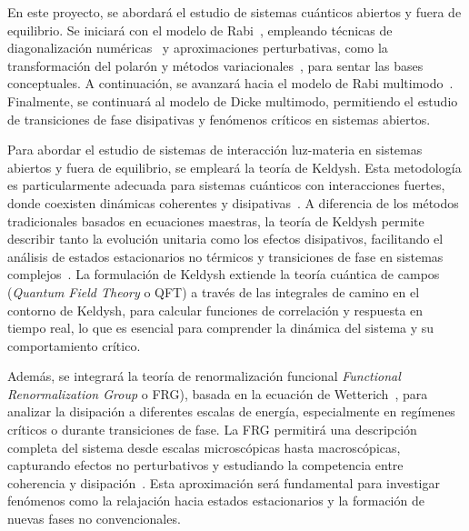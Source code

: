 \documentclass[onecolumn,notitlepage,letterpaper,aps,pra,12pt]{article}
\numberwithin{equation}{section}
\begin{document}













En este proyecto, se abordará el estudio de sistemas cuánticos abiertos y fuera de equilibrio. Se iniciará con el modelo de Rabi~\cite{rabi1936}, empleando técnicas  de diagonalización numéricas~\cite{irish2007} y aproximaciones perturbativas, como la transformación del polarón y métodos variacionales~\cite{gonzalez2021}, para sentar las bases conceptuales. A continuación, se avanzará hacia el modelo de Rabi multimodo~\cite{peng2021}. Finalmente, se continuará al modelo de Dicke multimodo, permitiendo el estudio de transiciones de fase disipativas y fenómenos críticos en sistemas abiertos. 

Para abordar el estudio de sistemas de interacción luz-materia en sistemas abiertos y fuera de equilibrio, se empleará la teoría de Keldysh. Esta metodología es particularmente adecuada para sistemas cuánticos con interacciones fuertes, donde coexisten dinámicas coherentes y disipativas~\cite{kamenev2023,rammer2011}. A diferencia de los métodos tradicionales basados en ecuaciones maestras, la teoría de Keldysh permite describir tanto la evolución unitaria como los efectos disipativos, facilitando el análisis de estados estacionarios no térmicos y transiciones de fase en sistemas complejos~\cite{Sieberer2016}.  La formulación de Keldysh extiende la teoría cuántica de campos (\textit{Quantum Field Theory} o QFT) a través de las integrales de camino en el contorno de Keldysh, para calcular funciones de correlación y respuesta en tiempo real, lo que es esencial para comprender la dinámica del sistema y su comportamiento crítico.

Además, se integrará la teoría de renormalización funcional \textit{Functional Renormalization Group} o FRG), basada en la ecuación de Wetterich~\cite{wetterich1993}, para analizar la disipación a diferentes escalas de energía, especialmente en regímenes críticos o durante transiciones de fase. La FRG permitirá una descripción completa del sistema desde escalas microscópicas hasta macroscópicas, capturando efectos no perturbativos y estudiando la competencia entre coherencia y disipación~\cite{angelakis2007}. Esta aproximación será fundamental para investigar fenómenos como la relajación hacia estados estacionarios y la formación de nuevas fases no convencionales.
\end{document}
